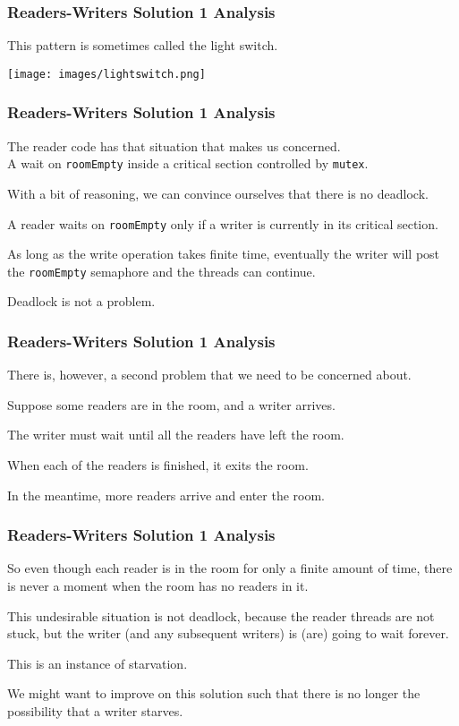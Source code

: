 \begin{frame}
	\frametitle{Readers-Writers Solution 1 Analysis}

	This pattern is sometimes called the \alert{light switch}.

	\begin{center}
		\texttt{[image: images/lightswitch.png]}
	\end{center}

\end{frame}


\begin{frame}
	\frametitle{Readers-Writers Solution 1 Analysis}

	The reader code has that situation that makes us concerned.\\
	\quad A wait on \texttt{roomEmpty} inside a critical section controlled by \texttt{mutex}.

	With a bit of reasoning, we can convince ourselves that there is no deadlock.

	A reader waits on \texttt{roomEmpty} only if a writer is currently in its critical section.

	As long as the write operation takes finite time, eventually the writer will post the \texttt{roomEmpty} semaphore and the threads can continue.

	Deadlock is not a problem.

\end{frame}


\begin{frame}
	\frametitle{Readers-Writers Solution 1 Analysis}

	There is, however, a second problem that we need to be concerned about.

	Suppose some readers are in the room, and a writer arrives.

	The writer must wait until all the readers have left the room.

	When each of the readers is finished, it exits the room.

	In the meantime, more readers arrive and enter the room.
\end{frame}


\begin{frame}
	\frametitle{Readers-Writers Solution 1 Analysis}

	So even though each reader is in the room for only a finite amount of time, there is never a moment when the room has no readers in it.

	This undesirable situation is not deadlock, because the reader threads are not stuck, but the writer (and any subsequent writers) is (are) going to wait forever.

	This is an instance of \alert{starvation}.

	We might want to improve on this solution such that there is no longer the possibility that a writer starves.

\end{frame}


